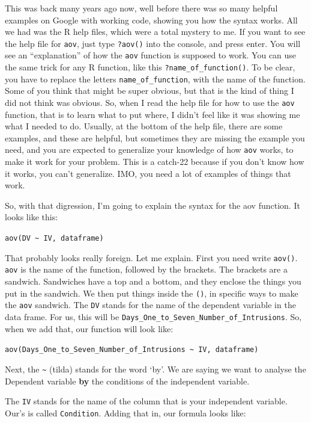 \documentclass[]{book}
\theoremstyle{definition}
\theoremstyle{definition}
\theoremstyle{definition}
\theoremstyle{remark}
\begin{document}
This was back many years ago now, well before there was so many helpful
examples on Google with working code, showing you how the syntax works.
All we had was the R help files, which were a total mystery to me. If
you want to see the help file for \texttt{aov}, just type
\texttt{?aov()} into the console, and press enter. You will see an
``explanation'' of how the \texttt{aov} function is supposed to work.
You can use the same trick for any R function, like this
\texttt{?name\_of\_function()}. To be clear, you have to replace the
letters \texttt{name\_of\_function}, with the name of the function. Some
of you think that might be super obvious, but that is the kind of thing
I did not think was obvious. So, when I read the help file for how to
use the \texttt{aov} function, that is to learn what to put where, I
didn't feel like it was showing me what I needed to do. Usually, at the
bottom of the help file, there are some examples, and these are helpful,
but sometimes they are missing the example you need, and you are
expected to generalize your knowledge of how \texttt{aov} works, to make
it work for your problem. This is a catch-22 because if you don't know
how it works, you can't generalize. IMO, you need a lot of examples of
things that work.

So, with that digression, I'm going to explain the syntax for the aov
function. It looks like this:

\texttt{aov(DV\ \textasciitilde{}\ IV,\ dataframe)}

That probably looks really foreign. Let me explain. First you need write
\texttt{aov()}. \texttt{aov} is the name of the function, followed by
the brackets. The brackets are a sandwich. Sandwiches have a top and a
bottom, and they enclose the things you put in the sandwich. We then put
things inside the \texttt{()}, in specific ways to make the \texttt{aov}
sandwich. The \texttt{DV} stands for the name of the dependent variable
in the data frame. For us, this will be
\texttt{Days\_One\_to\_Seven\_Number\_of\_Intrusions}. So, when we add
that, our function will look like:

\texttt{aov(Days\_One\_to\_Seven\_Number\_of\_Intrusions\ \textasciitilde{}\ IV,\ dataframe)}

Next, the \texttt{\textasciitilde{}} (tilda) stands for the word `by'.
We are saying we want to analyse the Dependent variable \textbf{by} the
conditions of the independent variable.

The \texttt{IV} stands for the name of the column that is your
independent variable. Our's is called \texttt{Condition}. Adding that
in, our formula looks like:
\end{document}

